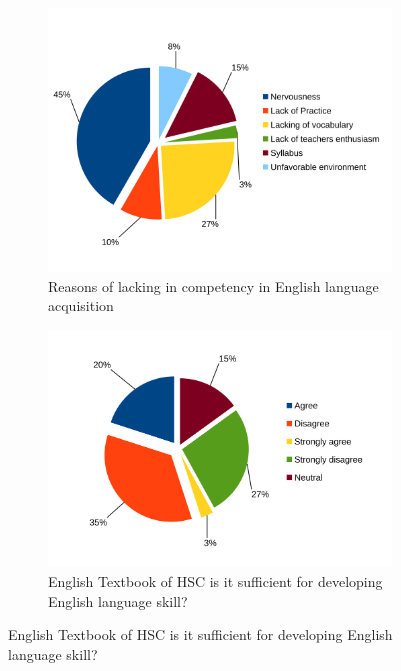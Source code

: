 \documentclass[sn-mathphys,Numbered]{sn-jnl}%
\theoremstyle{thmstyleone}%
\theoremstyle{thmstyletwo}%
\theoremstyle{thmstylethree}%
\begin{document}
\begin{figure}[h!]
\centering
\begin{subfigure}{0.48\textwidth}
    \includegraphics[width=\textwidth]{obstacles.png}
    \caption{Reasons of lacking in competency in English language acquisition}
    \label{obstacles_mainly}
\end{subfigure}
\hfill
\begin{subfigure}{0.48\textwidth}
    \includegraphics[width=\textwidth]{agreement.png}
    \caption{English Textbook of HSC is it sufficient for developing English language skill?}
    \label{HSC_textbook_sufficient}
\end{subfigure}       
\label{cv_umass}
\end{figure}
\end{document}
